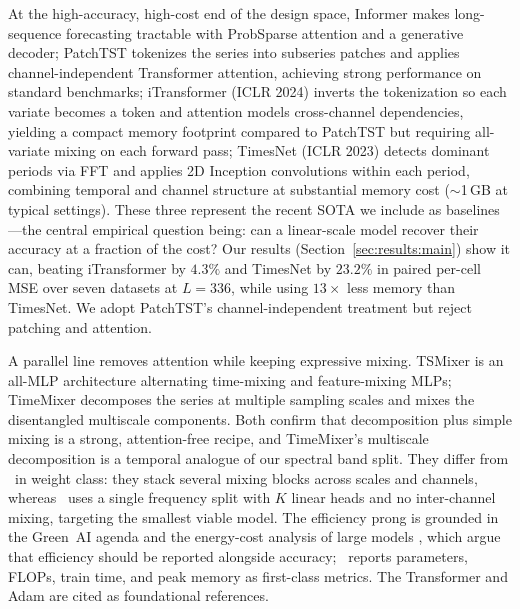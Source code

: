 At the high-accuracy, high-cost end of the design space, Informer
\citep{zhou2021informer} makes long-sequence forecasting tractable with
ProbSparse attention and a generative decoder; PatchTST \citep{nie2023patchtst}
tokenizes the series into subseries patches and applies channel-independent
Transformer attention, achieving strong performance on standard benchmarks;
iTransformer \citep{liu2024itransformer} (ICLR 2024) inverts the tokenization so
each variate becomes a token and attention models cross-channel dependencies,
yielding a compact memory footprint compared to PatchTST but requiring all-variate
mixing on each forward pass; TimesNet \citep{wu2023timesnet} (ICLR 2023) detects
dominant periods via FFT and applies 2D Inception convolutions within each period,
combining temporal and channel structure at substantial memory cost
($\sim$1\,GB at typical settings). These three represent the recent SOTA we
include as baselines---the central empirical question being: can a linear-scale
model recover their accuracy at a fraction of the cost? Our results
(Section~\ref{sec:results:main}) show it can, beating iTransformer by $4.3\%$
and TimesNet by $23.2\%$ in paired per-cell MSE over seven datasets at
$L{=}336$, while using $13\times$ less memory than TimesNet. We adopt PatchTST's channel-independent treatment but reject patching
and attention.

A parallel line removes attention while keeping expressive mixing. TSMixer
\citep{chen2023tsmixer} is an all-MLP architecture alternating time-mixing and
feature-mixing MLPs; TimeMixer \citep{wang2024timemixer} decomposes the series at
multiple sampling scales and mixes the disentangled multiscale components. Both
confirm that decomposition plus simple mixing is a strong, attention-free recipe,
and TimeMixer's multiscale decomposition is a temporal analogue of our spectral
band split. They differ from \method\ in weight class: they stack several mixing
blocks across scales and channels, whereas \method\ uses a single frequency split
with $K$ linear heads and no inter-channel mixing, targeting the smallest viable
model. The efficiency prong is grounded in the Green~AI agenda
\citep{schwartz2020greenai} and the energy-cost analysis of large models
\citep{strubell2019energy}, which argue that efficiency should be reported
alongside accuracy; \method\ reports parameters, FLOPs, train time, and peak
memory as first-class metrics. The Transformer \citep{vaswani2017attention} and
Adam \citep{kingma2015adam} are cited as foundational references.

